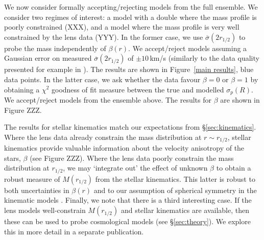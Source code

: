 \documentclass[galley,usenatbib]{mn2e}
\newcommand{\figref}[1] {Figure~\ref{#1}}
\newcommand{\eqnref}[1] {Eq.~(\ref{#1})}
\begin{document}
We now consider formally accepting/rejecting models from the full ensemble. We
consider two regimes of interest: a model with a double where the mass profile
is poorly constrained (XXX), and a model where the mass profile is very well
constrained by the lens data (YYY). In the former case, we use
$\overline{\sigma}(2 r_{1/2})$ to probe the mass independently of $\beta(r)$.
We accept/reject models assuming a Gaussian error on measured
$\overline{\sigma}(2 r_{1/2})$ of $\pm 10$\,km/s (similarly to the data quality
presented for example in \citealt{2002MNRAS.337L...6T}). The results are shown
in \figref{main results}, blue data points. In the latter case, we ask whether
the data favour $\beta = 0$ or $\beta = 1$ by obtaining a $\chi^2$ goodness of
fit measure between the true and modelled $\sigma_p(R)$. We accept/reject
models from the ensemble above. The results for $\beta$ are shown in Figure
ZZZ. 

The results for stellar kinematics match our expectations from
\S\ref{sec:kinematics}. Where the lens data already constrain the mass
distribution at $r \sim r_{1/2}$, stellar kinematics provide valuable
information about the velocity anisotropy of the stars, $\beta$ (see Figure
ZZZ). Where the lens data poorly constrain the mass distribution at $r_{1/2}$,
we may `integrate out' the effect of unknown $\beta$ to obtain a robust measure
of $M(r_{1/2})$ from the stellar kinematics. This latter is robust to both
uncertainties in $\beta(r)$ and to our assumption of spherical symmetry in the
kinematic models \citep{2012ApJ...754L..39A}. Finally, we note that there is a
third interesting case. If the lens models well-constrain $M(r_{1/2})$ and
stellar kinematics are available, then these can be used to probe cosmological
models (see \S\ref{sec:theory}). We explore this in more detail in a separate
publication. 

\end{document}
